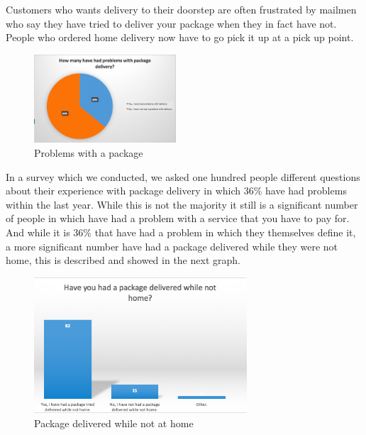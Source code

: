 \documentclass[12pt]{report}
\begin{document}
Customers who wants delivery to their doorstep are often frustrated by mailmen who say they have tried to deliver your package when they in fact have not. People who ordered home delivery now have to go pick it up at a pick up point.

\begin{figure}[H]
  \centering
  \includegraphics[width=200]{pics/problemswithpackage.png}
  \caption{Problems with a package}
  \label{fig: Customer satisfaction}
\end{figure}

In a survey which we conducted, we asked one hundred people different questions about their experience with package delivery in which 36\% have had problems within the last year. While this is not the majority it still is a significant number of people in which have had a problem with a service that you have to pay for.\\\hspace*{5 mm}
And while it is 36\% that have had a problem in which they themselves define it, a more significant number have had a package delivered while they were not home, this is described and showed in the next graph.
\begin{figure}[H]
  \centering
  \includegraphics[width=300]{pics/packagedeliverednothome.png}
  \caption{Package delivered while not at home}
  \label{fig: Customer satisfaction}
\end{figure}
\end{document}
